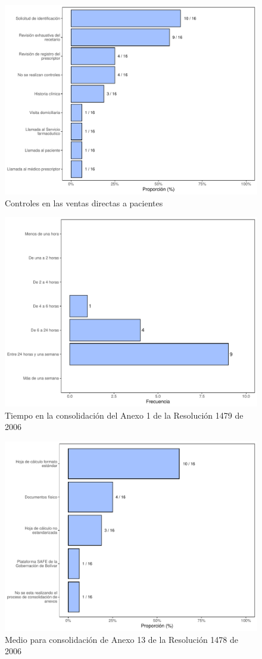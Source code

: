 \documentclass[
]{book}
\begin{document}
\begin{figure}
\includegraphics[width=0.85\linewidth]{InformeFinal_files/figure-latex/ControlesVentasFRE-1} \caption{Controles en las ventas directas a pacientes}\label{fig:ControlesVentasFRE}
\end{figure}
\begin{figure}
\includegraphics[width=0.85\linewidth]{InformeFinal_files/figure-latex/TiemposConsolidacionA1-1} \caption{Tiempo en la consolidación del Anexo 1 de la Resolución 1479 de 2006}\label{fig:TiemposConsolidacionA1}
\end{figure}
\begin{figure}
\includegraphics[width=0.85\linewidth]{InformeFinal_files/figure-latex/RecepcionA13-1} \caption{Medio para consolidación de Anexo 13 de la Resolución 1478 de 2006}\label{fig:RecepcionA13}
\end{figure}
\end{document}
